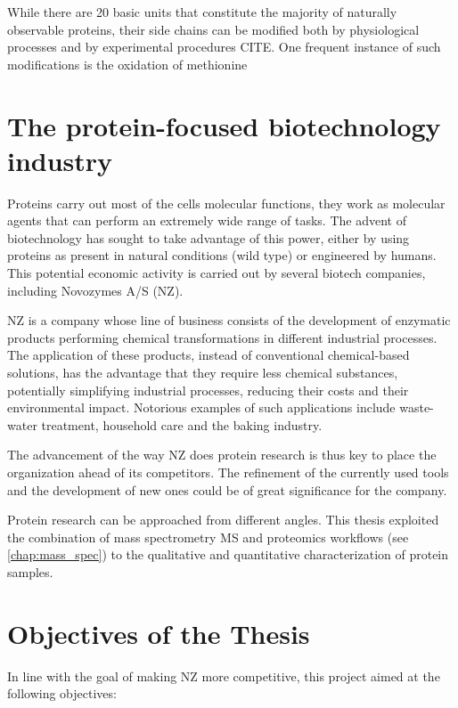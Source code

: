 \documentclass[11pt, a4paper]{report}
\begin{document}
While there are 20 basic units that constitute the majority of naturally observable proteins, their side chains can be modified both by physiological processes and by experimental procedures CITE. One frequent instance of such modifications is the oxidation of methionine


\section{The protein-focused biotechnology industry}


Proteins carry out most of the cell\textquotesingle s molecular functions, they work as molecular agents that can perform an extremely wide range of tasks. The advent of biotechnology has sought to take advantage of this power, either by using proteins as present in natural conditions (wild type) or engineered by humans. This potential economic activity is carried out by several biotech companies, including Novozymes A/S (NZ).

\ac{NZ} is a company whose line of business consists of the development of enzymatic products performing chemical transformations in different industrial processes. The application of these products, instead of conventional chemical-based solutions, has the advantage that they require less chemical substances, potentially simplifying industrial processes, reducing their costs and their environmental impact. Notorious examples of such applications include waste-water treatment, household care and the baking industry.


The advancement of the way \ac{NZ} does protein research is thus key to place the organization ahead of its competitors. The refinement of the currently used tools and the development of new ones could be of great significance for the company. 

Protein research can be approached from different angles. This thesis exploited the combination of mass spectrometry \ac{MS} and proteomics workflows (see \ref{chap:mass_spec}) to the qualitative and quantitative characterization of protein samples.



\section{Objectives of the Thesis}
\label{sec:objectives}

In line with the goal of making \ac{NZ} more competitive, this project aimed at the following objectives:
\end{document}
